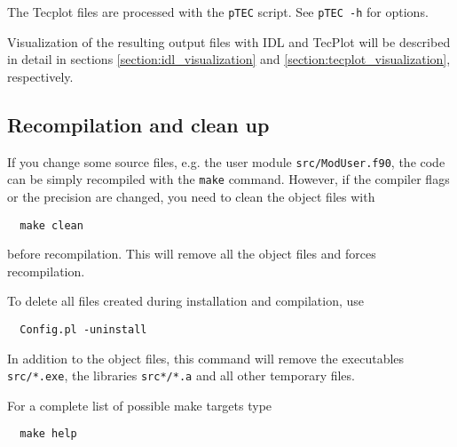 The Tecplot files are processed with the {\tt pTEC} script.
See {\tt pTEC -h} for options.

Visualization of the resulting output files with IDL and TecPlot
will be described in detail in sections \ref{section:idl_visualization}
and \ref{section:tecplot_visualization}, respectively.

\subsection{Recompilation and clean up}

If you change some source files, e.g. the user module {\tt src/ModUser.f90},
the code can be simply recompiled with the {\tt make} command. 
However, if the compiler flags or the precision are changed, you need to clean the
object files with
\begin{verbatim}
  make clean
\end{verbatim}
before recompilation. This will remove all the object files and forces recompilation.

To delete all files created during installation and compilation, use
\begin{verbatim}
  Config.pl -uninstall
\end{verbatim}
In addition to the object files, 
this command will remove the executables {\tt src/*.exe}, 
the libraries {\tt src*/*.a} and all other temporary files.

For a complete list of possible make targets type
\begin{verbatim}
  make help
\end{verbatim}
